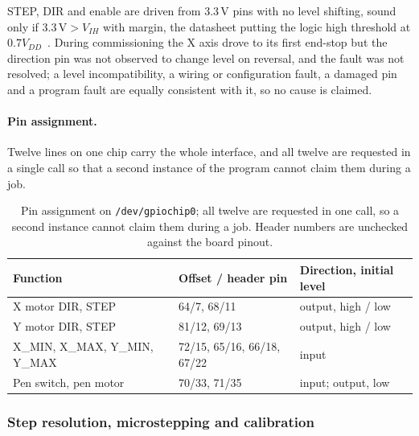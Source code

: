 STEP, DIR and enable are driven from 3.3\,V pins with no level shifting, sound only if $3.3\,\mathrm{V}>V_{IH}$ with margin, the datasheet putting the logic high threshold at $0.7V_{DD}$~\cite[p.~4]{a4988ds}. During commissioning the X axis drove to its first end-stop but the direction pin was not observed to change level on reversal, and the fault was not resolved; a level incompatibility, a wiring or configuration fault, a damaged pin and a program fault are equally consistent with it, so no cause is claimed.

\paragraph{Pin assignment.}
Twelve lines on one chip carry the whole interface, and all twelve are requested in a single call so that a second instance of the program cannot claim them during a job.

\begin{table}[!htbp]
\centering
\fontsize{8}{9.2}\selectfont
\setlength{\tabcolsep}{3pt}\renewcommand{\arraystretch}{1.0}
\begin{tabularx}{\linewidth}{|p{3.4cm}|X|p{3.6cm}|}
\hline
\textbf{Function} & \textbf{Offset / header pin} & \textbf{Direction, initial level} \\
\hline
X motor DIR, STEP & 64/7, 68/11 & output, high / low \\
Y motor DIR, STEP & 81/12, 69/13 & output, high / low \\
X\_MIN, X\_MAX, Y\_MIN, Y\_MAX & 72/15, 65/16, 66/18, 67/22 & input \\
Pen switch, pen motor & 70/33, 71/35 & input; output, low \\
\hline
\end{tabularx}
\caption{Pin assignment on \texttt{/dev/gpiochip0}; all twelve are requested in one call, so a second instance cannot claim them during a job. Header numbers are unchecked against the board pinout.}
\label{tab:gan-pins}
\end{table}

\subsubsection{Step resolution, microstepping and calibration}
\label{sec:gan-res}
\label{sec:gan-timing}

